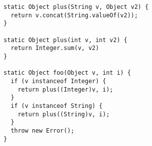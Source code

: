 {\scriptsize \begin{verbatim}
  static Object plus(String v, Object v2) {
    return v.concat(String.valueOf(v2));
  }

  static Object plus(int v, int v2) {
    return Integer.sum(v, v2)
  }

  static Object foo(Object v, int i) {
    if (v instanceof Integer) {
      return plus((Integer)v, i);
    }
    if (v instanceof String) {
      return plus((String)v, i);
    }
    throw new Error();
  }
\end{verbatim} }
